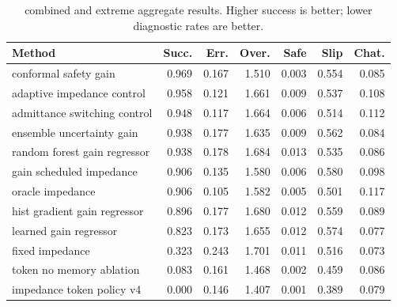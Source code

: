\begin{table}[t]
\centering
\caption{combined and extreme aggregate results. Higher success is better; lower diagnostic rates are better.}
\label{tab:combined-aggregate}
\small
\begin{tabular}{lrrrrrr}
\toprule
Method & Succ. & Err. & Over. & Safe & Slip & Chat. \\
\midrule
conformal safety gain & 0.969 & 0.167 & 1.510 & 0.003 & 0.554 & 0.085 \\
adaptive impedance control & 0.958 & 0.121 & 1.661 & 0.009 & 0.537 & 0.108 \\
admittance switching control & 0.948 & 0.117 & 1.664 & 0.006 & 0.514 & 0.112 \\
ensemble uncertainty gain & 0.938 & 0.177 & 1.635 & 0.009 & 0.562 & 0.084 \\
random forest gain regressor & 0.938 & 0.178 & 1.684 & 0.013 & 0.535 & 0.086 \\
gain scheduled impedance & 0.906 & 0.135 & 1.580 & 0.006 & 0.580 & 0.098 \\
oracle impedance & 0.906 & 0.105 & 1.582 & 0.005 & 0.501 & 0.117 \\
hist gradient gain regressor & 0.896 & 0.177 & 1.680 & 0.012 & 0.559 & 0.089 \\
learned gain regressor & 0.823 & 0.173 & 1.655 & 0.012 & 0.574 & 0.077 \\
fixed impedance & 0.323 & 0.243 & 1.701 & 0.011 & 0.516 & 0.073 \\
token no memory ablation & 0.083 & 0.161 & 1.468 & 0.002 & 0.459 & 0.086 \\
impedance token policy v4 & 0.000 & 0.146 & 1.407 & 0.001 & 0.389 & 0.079 \\
\bottomrule
\end{tabular}
\end{table}
